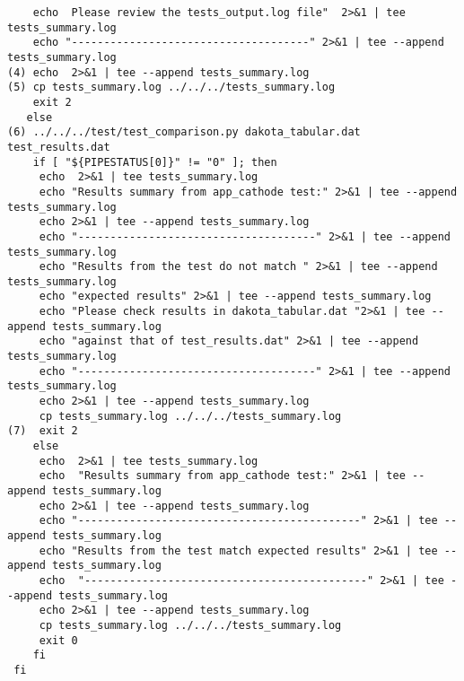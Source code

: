 \begin{changemargin}{-1.5cm}{-1cm}
\begin{lstlisting}
    echo  Please review the tests_output.log file"  2>&1 | tee tests_summary.log
    echo "-------------------------------------" 2>&1 | tee --append tests_summary.log
(4) echo  2>&1 | tee --append tests_summary.log
(5) cp tests_summary.log ../../../tests_summary.log 
    exit 2
   else
(6) ../../../test/test_comparison.py dakota_tabular.dat test_results.dat
    if [ "${PIPESTATUS[0]}" != "0" ]; then
     echo  2>&1 | tee tests_summary.log
     echo "Results summary from app_cathode test:" 2>&1 | tee --append tests_summary.log
     echo 2>&1 | tee --append tests_summary.log
     echo "-------------------------------------" 2>&1 | tee --append tests_summary.log
     echo "Results from the test do not match " 2>&1 | tee --append tests_summary.log
     echo "expected results" 2>&1 | tee --append tests_summary.log
     echo "Please check results in dakota_tabular.dat "2>&1 | tee --append tests_summary.log
     echo "against that of test_results.dat" 2>&1 | tee --append tests_summary.log
     echo "-------------------------------------" 2>&1 | tee --append tests_summary.log
     echo 2>&1 | tee --append tests_summary.log
     cp tests_summary.log ../../../tests_summary.log 
(7)  exit 2
    else 
     echo  2>&1 | tee tests_summary.log
     echo  "Results summary from app_cathode test:" 2>&1 | tee --append tests_summary.log
     echo 2>&1 | tee --append tests_summary.log
     echo "--------------------------------------------" 2>&1 | tee --append tests_summary.log
     echo "Results from the test match expected results" 2>&1 | tee --append tests_summary.log
     echo  "--------------------------------------------" 2>&1 | tee --append tests_summary.log
     echo 2>&1 | tee --append tests_summary.log
     cp tests_summary.log ../../../tests_summary.log 
     exit 0
    fi
 fi 
\end{lstlisting}
\end{changemargin}